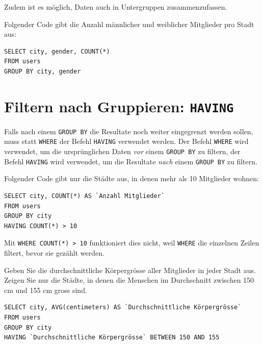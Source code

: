 Zudem ist es möglich, Daten auch in Untergruppen zusammenzufassen.

\begin{myexample}
Folgender Code gibt die Anzahl männlicher und weiblicher Mitglieder pro Stadt aus:
\begin{lstlisting}
SELECT city, gender, COUNT(*)
FROM users
GROUP BY city, gender
\end{lstlisting}
\end{myexample}

\section{Filtern nach Gruppieren: \texorpdfstring{\lstinline|HAVING|}{HAVING}}
Falls nach einem \lstinline|GROUP BY| die Resultate noch weiter eingegrenzt werden sollen, muss statt \lstinline|WHERE| der Befehl \lstinline|HAVING| verwendet werden. Der Befehl \lstinline|WHERE| wird verwendet, um die ursprünglichen Daten \textit{vor} einem \lstinline|GROUP BY| zu filtern, der Befehl \lstinline|HAVING| wird verwendet, um die Resultate \textit{nach} einem \lstinline|GROUP BY| zu filtern.

\begin{myexample}\label{myexample:having}
Folgender Code gibt nur die Städte aus, in denen mehr als 10 Mitglieder wohnen:
\begin{lstlisting}
SELECT city, COUNT(*) AS `Anzahl Mitglieder`
FROM users
GROUP BY city
HAVING COUNT(*) > 10
\end{lstlisting}
Mit \lstinline|WHERE COUNT(*) > 10| funktioniert dies nicht, weil \lstinline|WHERE| die einzelnen Zeilen filtert, bevor sie gezählt werden.
\end{myexample}

\begin{mychallenge}\label{mychallenge:having}
  Geben Sie die durchschnittliche Körpergrösse aller Mitglieder in jeder Stadt aus. Zeigen Sie nur die Städte, in denen die Menschen im Durchschnitt zwischen 150 cm und 155 cm gross sind.
  \begin{myanswer}
    \begin{lstlisting}
SELECT city, AVG(centimeters) AS `Durchschnittliche Körpergrösse`
FROM users
GROUP BY city
HAVING `Durchschnittliche Körpergrösse` BETWEEN 150 AND 155
\end{lstlisting}
  \end{myanswer}
\end{mychallenge}

